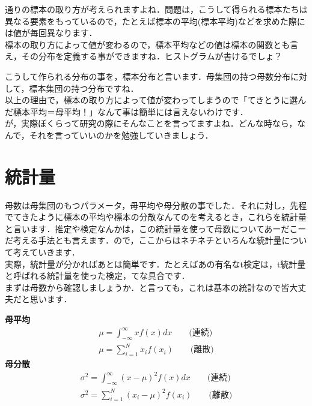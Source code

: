 \documentclass[11pt,a4paper,uplatex]{ujreport} 	%
\begin{document}
通りの標本の取り方が考えられますよね．問題は，こうして得られる標本たちは異なる要素をもっているので，たとえば標本の平均(標本平均)などを求めた際には値が毎回異なります．\\

標本の取り方によって値が変わるので，標本平均などの値は標本の関数とも言え，その分布を定義する事ができますね．ヒストグラムが書けるでしょ？

こうして作られる分布の事を，標本分布と言います．母集団の持つ母数分布に対して，標本集団の持つ分布ですね．\\

以上の理由で，標本の取り方によって値が変わってしまうので「てきとうに選んだ標本平均＝母平均！」なんて事は簡単には言えないわけです．\\

が，実際ぼくらって研究の際にそんなことを言ってますよね．どんな時なら，なんで，それを言っていいのかを勉強していきましょう．
\section{統計量}
母数は母集団のもつパラメータ，母平均や母分散の事でした．それに対し，先程でてきたように標本の平均や標本の分散なんてのを考えるとき，これらを統計量と言います．推定や検定なんかは，この統計量を使って母数についてあーだこーだ考える手法とも言えます．ので，ここからはネチネチといろんな統計量について考えていきます．\\

実際，統計量が分かればあとは簡単です．たとえばあの有名なt検定は，t統計量と呼ばれる統計量を使った検定，てな具合です．\\

まずは母数から確認しましょうか．と言っても，これは基本の統計なので皆大丈夫だと思います．

\begin{screen}
  \textbf{母平均}
  \begin{align}
    \mu = \int_{-\infty}^{\infty} x f(x) dx \qquad \text{(連続)}\\
    \mu = \sum_{i=1}^N x_i f(x_i) \qquad \text{(離散)}
  \end{align}  
  \textbf{母分散}
  \begin{align}
    \sigma^2 = \int_{-\infty}^{\infty} (x-\mu)^2f(x)dx \qquad \text{(連続)}\\
    \sigma^2 = \sum_{i=1}^N (x_i-\mu)^2 f(x_i) \qquad \text{(離散)}
  \end{align}
\end{screen}
\end{document}
